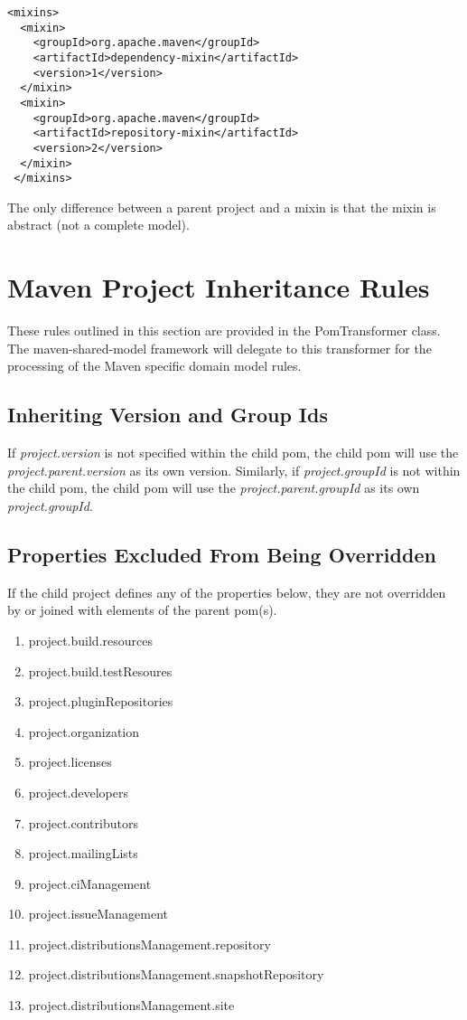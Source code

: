 \documentclass[12pt]{amsart}
\begin{document}
\begin{verbatim}
<mixins>
  <mixin>
    <groupId>org.apache.maven</groupId>
    <artifactId>dependency-mixin</artifactId>
    <version>1</version>
  </mixin>
  <mixin>
    <groupId>org.apache.maven</groupId>
    <artifactId>repository-mixin</artifactId>
    <version>2</version>
  </mixin>
 </mixins>
\end{verbatim}

The only difference between a parent project and a mixin is that the mixin is abstract (not a complete model).

\section{Maven Project Inheritance Rules}
These rules outlined in this section are provided in the PomTransformer class. The maven-shared-model framework will delegate to this transformer for the processing of the Maven specific domain model rules.

\subsection{Inheriting Version and Group Ids}
If \emph{project.version} is not specified within the child pom, the child pom will use the \emph{project.parent.version} as its own version. Similarly, if \emph{project.groupId} is not within the child pom, the child pom will use the \emph{project.parent.groupId} as its own \emph{project.groupId}.

\subsection{Properties Excluded From Being Overridden}
If the child project defines any of the properties below, they are not overridden by or joined with elements of the parent pom(s). 

\begin{enumerate}
\item project.build.resources
\item project.build.testResoures
\item project.pluginRepositories 
\item project.organization 
\item project.licenses
\item project.developers
\item project.contributors
\item project.mailingLists
\item project.ciManagement
\item project.issueManagement
\item project.distributionsManagement.repository
\item project.distributionsManagement.snapshotRepository
\item project.distributionsManagement.site
\end{enumerate}
\end{document}
